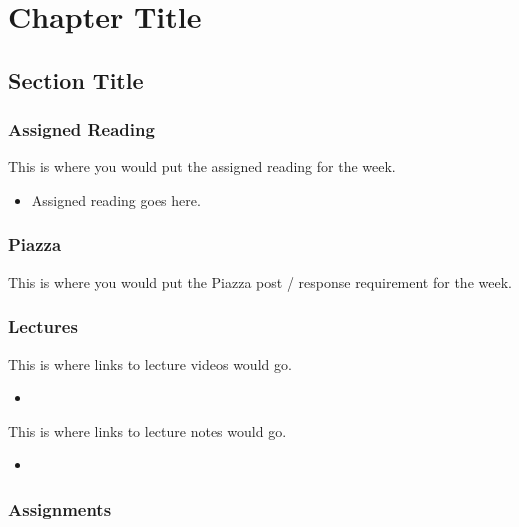 \clearpage

\newcommand{\ChapTitle}{Chapter Title}
\newcommand{\SectionTitle}{Section Title}

\chapter{\ChapTitle}
\section{\SectionTitle}

\subsection{Assigned Reading}

This is where you would put the assigned reading for the week.

\begin{itemize}
    \item Assigned reading goes here.
\end{itemize}

\subsection{Piazza}

This is where you would put the Piazza post / response requirement for the week.

\subsection{Lectures}

This is where links to lecture videos would go.

\begin{itemize}
    \item {}
\end{itemize}

\noindent This is where links to lecture notes would go.

\begin{itemize}
    \item {}
\end{itemize}

\subsection{Assignments}

